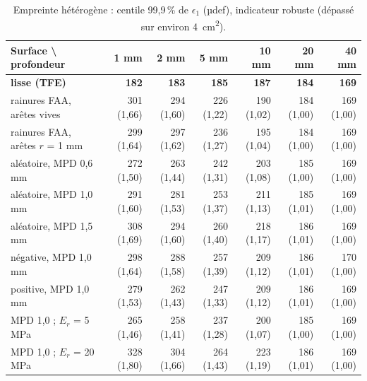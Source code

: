 \begin{table}[H]\centering\footnotesize
\caption{Empreinte hétérogène : centile 99,9\,\% de $\epsilon_1$ (µdef), indicateur robuste (dépassé sur environ \SI{4}{cm^2}).}\label{tab:het_e1p}
\begin{tabular}{lrrrrrr}
\toprule
Surface \textbackslash{} profondeur & 1 mm & 2 mm & 5 mm & 10 mm & 20 mm & 40 mm\\
\midrule
\textbf{lisse (TFE)} & \textbf{182} & \textbf{183} & \textbf{185} & \textbf{187} & \textbf{184} & \textbf{169}\\ \midrule
rainures FAA, arêtes vives & 301 (1,66) & 294 (1,60) & 226 (1,22) & 190 (1,02) & 184 (1,00) & 169 (1,00)\\
rainures FAA, arêtes $r$ = 1 mm & 299 (1,64) & 297 (1,62) & 236 (1,27) & 195 (1,04) & 184 (1,00) & 169 (1,00)\\
aléatoire, MPD 0,6 mm & 272 (1,50) & 263 (1,44) & 242 (1,31) & 203 (1,08) & 185 (1,00) & 169 (1,00)\\
aléatoire, MPD 1,0 mm & 291 (1,60) & 281 (1,53) & 253 (1,37) & 211 (1,13) & 185 (1,01) & 169 (1,00)\\
aléatoire, MPD 1,5 mm & 308 (1,69) & 294 (1,60) & 260 (1,40) & 218 (1,17) & 186 (1,01) & 169 (1,00)\\
négative, MPD 1,0 mm & 298 (1,64) & 288 (1,58) & 257 (1,39) & 209 (1,12) & 186 (1,01) & 170 (1,00)\\
positive, MPD 1,0 mm & 279 (1,53) & 262 (1,43) & 247 (1,33) & 209 (1,12) & 186 (1,01) & 169 (1,00)\\
MPD 1,0 ; $E_r$ = 5 MPa & 265 (1,46) & 258 (1,41) & 237 (1,28) & 200 (1,07) & 185 (1,00) & 169 (1,00)\\
MPD 1,0 ; $E_r$ = 20 MPa & 328 (1,80) & 304 (1,66) & 264 (1,43) & 223 (1,19) & 186 (1,01) & 169 (1,00)\\
\bottomrule
\end{tabular}
\end{table}

